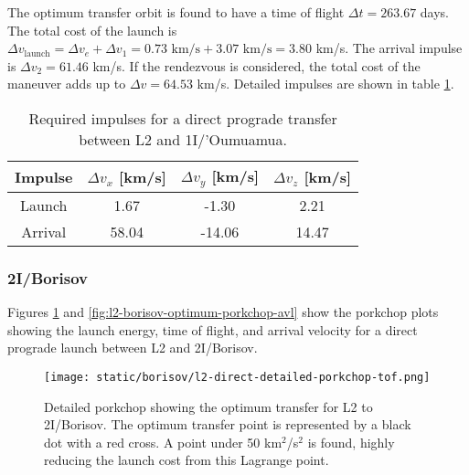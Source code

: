 The optimum transfer orbit is found to have a time of flight $\Delta t = 263.67$
days. The total cost of the launch is $\Delta v_\text{launch} = \Delta v_e +
  \Delta v_1 = 0.73 \text{ km/s} + 3.07 \text{ km/s} = 3.80$ km/s. The arrival
impulse is $\Delta v_2 = 61.46$ km/s. If the rendezvous is considered, the total
cost of the maneuver adds up to $\Delta v = 64.53$ km/s. Detailed impulses are
shown in table \ref{tab:l2-oumuamua-direct-transfer-impulses}.

\vspace{1cm}
\begin{table}[H]
  \centering
  \begin{tabular}{|c|c|c|c|}
    \hline
    Impulse & $\Delta v_x$ [km/s] & $\Delta v_y$ [km/s] & $\Delta v_z$ [km/s] \\
    \hline
    Launch  & 1.67                & -1.30               & 2.21                \\
    \hline
    Arrival & 58.04               & -14.06              & 14.47               \\
    \hline
  \end{tabular}
  \caption[Required impulses for a direct prograde transfer between L2 and
    1I/'Oumuamua]{Required impulses for a direct prograde transfer between L2 and
    1I/'Oumuamua.}
  \label{tab:l2-oumuamua-direct-transfer-impulses}
\end{table}


\subsubsection{2I/Borisov}

Figures \ref{fig:l2-borisov-optimum-porkchop} and
\ref{fig:l2-borisov-optimum-porkchop-avl} show the porkchop plots showing the
launch energy, time of flight, and arrival velocity for a direct prograde launch
between L2 and 2I/Borisov.

\begin{figure}[H]
  \centering
  \texttt{[image: static/borisov/l2-direct-detailed-porkchop-tof.png]}
  \caption[Detailed porkchop showing the optimum transfer for
    L2 to 2I/Borisov with the time of flight.]{Detailed porkchop showing the optimum transfer for
    L2 to 2I/Borisov. The optimum transfer point is represented by a black dot
        with a red cross.
 A point under 50 km$^2$/s$^2$ is found, highly
    reducing the launch cost from this Lagrange point.
  }
  \label{fig:l2-borisov-optimum-porkchop}
\end{figure}

